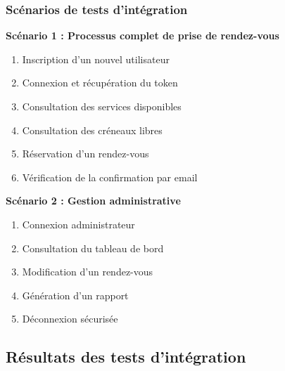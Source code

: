 \subsubsection{Scénarios de tests d'intégration}

\textbf{Scénario 1 : Processus complet de prise de rendez-vous}

\begin{enumerate}
    \item Inscription d'un nouvel utilisateur
    \item Connexion et récupération du token
    \item Consultation des services disponibles
    \item Consultation des créneaux libres
    \item Réservation d'un rendez-vous
    \item Vérification de la confirmation par email
\end{enumerate}

\textbf{Scénario 2 : Gestion administrative}

\begin{enumerate}
    \item Connexion administrateur
    \item Consultation du tableau de bord
    \item Modification d'un rendez-vous
    \item Génération d'un rapport
    \item Déconnexion sécurisée
\end{enumerate}

\subsection{Résultats des tests d'intégration}

